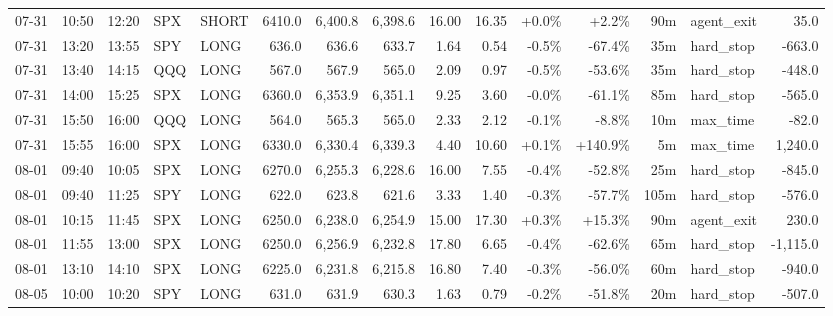\documentclass[11pt,a4paper,twoside]{article}
\begin{document}
\begin{landscape}
\begin{center}
\begin{longtable}{>{\color{txtmain}}l l l l l r r r r r r r r >{\color{txtmain}}l r}
07-31 & 10:50 & 12:20 & SPX & SHORT & 6410.0 & 6,400.8 & 6,398.6 & 16.00 & 16.35 & \textcolor{wingreen}{+0.0\%} & \textcolor{wingreen}{+2.2\%} & 90m & agent\_exit & \textcolor{wingreen}{35.0} \\
07-31 & 13:20 & 13:55 & SPY & LONG & 636.0 & 636.6 & 633.7 & 1.64 & 0.54 & \textcolor{lossred}{-0.5\%} & \textcolor{lossred}{-67.4\%} & 35m & hard\_stop & \textcolor{lossred}{-663.0} \\
07-31 & 13:40 & 14:15 & QQQ & LONG & 567.0 & 567.9 & 565.0 & 2.09 & 0.97 & \textcolor{lossred}{-0.5\%} & \textcolor{lossred}{-53.6\%} & 35m & hard\_stop & \textcolor{lossred}{-448.0} \\
07-31 & 14:00 & 15:25 & SPX & LONG & 6360.0 & 6,353.9 & 6,351.1 & 9.25 & 3.60 & \textcolor{lossred}{-0.0\%} & \textcolor{lossred}{-61.1\%} & 85m & hard\_stop & \textcolor{lossred}{-565.0} \\
07-31 & 15:50 & 16:00 & QQQ & LONG & 564.0 & 565.3 & 565.0 & 2.33 & 2.12 & \textcolor{lossred}{-0.1\%} & \textcolor{lossred}{-8.8\%} & 10m & max\_time & \textcolor{lossred}{-82.0} \\
07-31 & 15:55 & 16:00 & SPX & LONG & 6330.0 & 6,330.4 & 6,339.3 & 4.40 & 10.60 & \textcolor{wingreen}{+0.1\%} & \textcolor{wingreen}{+140.9\%} & 5m & max\_time & \textcolor{wingreen}{1,240.0} \\
08-01 & 09:40 & 10:05 & SPX & LONG & 6270.0 & 6,255.3 & 6,228.6 & 16.00 & 7.55 & \textcolor{lossred}{-0.4\%} & \textcolor{lossred}{-52.8\%} & 25m & hard\_stop & \textcolor{lossred}{-845.0} \\
08-01 & 09:40 & 11:25 & SPY & LONG & 622.0 & 623.8 & 621.6 & 3.33 & 1.40 & \textcolor{lossred}{-0.3\%} & \textcolor{lossred}{-57.7\%} & 105m & hard\_stop & \textcolor{lossred}{-576.0} \\
08-01 & 10:15 & 11:45 & SPX & LONG & 6250.0 & 6,238.0 & 6,254.9 & 15.00 & 17.30 & \textcolor{wingreen}{+0.3\%} & \textcolor{wingreen}{+15.3\%} & 90m & agent\_exit & \textcolor{wingreen}{230.0} \\
08-01 & 11:55 & 13:00 & SPX & LONG & 6250.0 & 6,256.9 & 6,232.8 & 17.80 & 6.65 & \textcolor{lossred}{-0.4\%} & \textcolor{lossred}{-62.6\%} & 65m & hard\_stop & \textcolor{lossred}{-1,115.0} \\
08-01 & 13:10 & 14:10 & SPX & LONG & 6225.0 & 6,231.8 & 6,215.8 & 16.80 & 7.40 & \textcolor{lossred}{-0.3\%} & \textcolor{lossred}{-56.0\%} & 60m & hard\_stop & \textcolor{lossred}{-940.0} \\
08-05 & 10:00 & 10:20 & SPY & LONG & 631.0 & 631.9 & 630.3 & 1.63 & 0.79 & \textcolor{lossred}{-0.2\%} & \textcolor{lossred}{-51.8\%} & 20m & hard\_stop & \textcolor{lossred}{-507.0} \\

\end{longtable}
\end{center}
\end{landscape}
\end{document}
